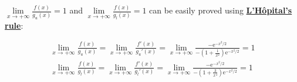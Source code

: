 \documentclass[8pt]{article}
\theoremstyle{compact}
\def\obj#1{\textbf{\uline{#1}}}
\def\e{\mathrm{e}}
\begin{document}
	$\lim\limits_{x \to +\infty}\frac{f(x)}{g_u(x)} = 1$ and $\lim\limits_{x \to +\infty}\frac{f(x)}{g_l(x)} = 1$ can be easily proved using \obj{L'Hôpital's rule}:

	\begin{align}
		\lim_{x \to +\infty}\frac{f(x)}{g_u(x)} = \lim_{x \to +\infty}\frac{f'(x)}{g_u'(x)} = \lim_{x \to +\infty} \frac{-\e^{-x^2/2}}{-\left(1 + \frac{1}{x^2}\right)\e^{-x^2/2}} = 1\\
		\lim_{x \to +\infty}\frac{f(x)}{g_l(x)} = \lim_{x \to +\infty}\frac{f'(x)}{g_l'(x)} = \lim_{x \to +\infty} \frac{-\e^{-x^2/2}}{-\left(1 + \frac{3}{x^4}\right)\e^{-x^2/2}} = 1
	\end{align}
\end{document}
